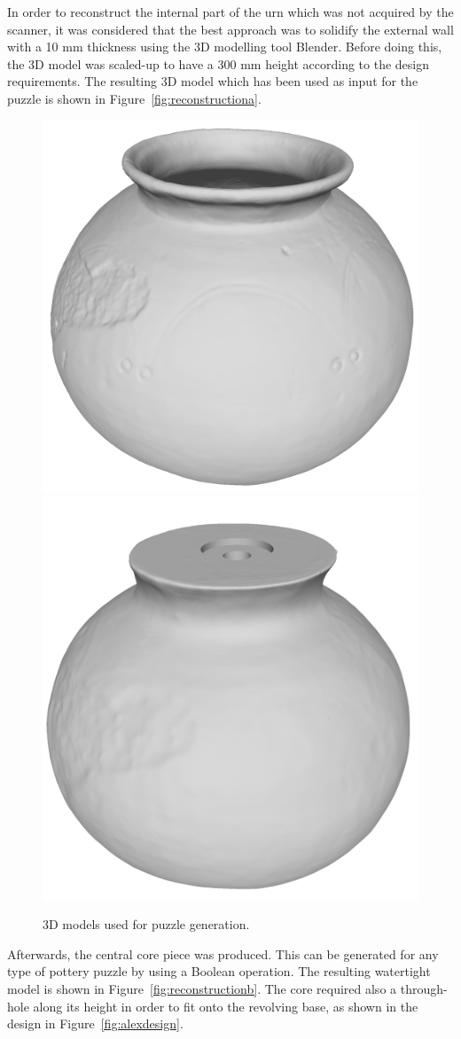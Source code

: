 \documentclass[acmlarge,screen,dvipsnames]{acmart}
\begin{document}
In order to reconstruct the internal part of the urn which was not
acquired by the scanner, it was considered that the best approach was
to solidify the external wall with a 10 mm thickness using the 3D
modelling tool Blender. Before doing this, the 3D model was scaled-up
to have a 300 mm height according to the design requirements. The
resulting 3D model which has been used as input for the puzzle is
shown in Figure~\ref{fig:reconstructiona}.
%
\begin{figure}[htb]
  \centering
  {\includegraphics[width=0.45\linewidth]{images/potcomplete}}
  {\includegraphics[width=0.45\linewidth]{images/corewhole}}
  \caption{3D models used for puzzle generation.}
\end{figure}
%

Afterwards, the central core piece was produced. This can be generated
for any type of pottery puzzle by using a Boolean operation. The
resulting watertight model is shown in
Figure~\ref{fig:reconstructionb}. The core required also a
through-hole along its height in order to fit onto the revolving base,
as shown in the design in Figure~\ref{fig:alexdesign}.
\end{document}
